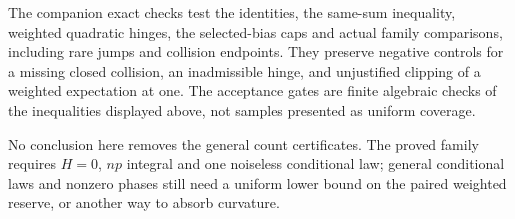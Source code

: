 \documentclass[11pt,a4paper]{article}
\begin{document}
The companion exact checks test the identities, the same-sum inequality,
weighted quadratic hinges, the selected-bias caps and actual family
comparisons, including rare jumps and collision endpoints. They preserve
negative controls for a missing closed collision, an inadmissible hinge, and
unjustified clipping of a weighted expectation at one.
The acceptance gates are finite algebraic checks of the inequalities displayed
above, not samples presented as uniform coverage.

No conclusion here removes the general count certificates. The proved
family requires $H=0$, $np$ integral and one noiseless conditional law;
general conditional laws and nonzero phases still need a uniform lower bound
on the paired weighted reserve, or another way to absorb curvature.
\end{document}

